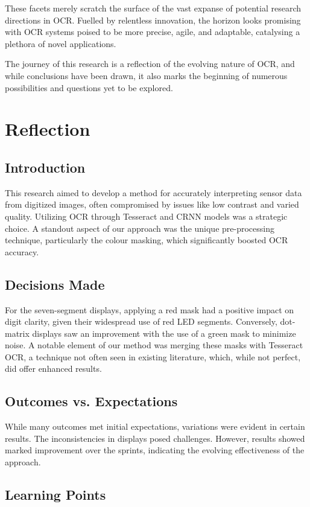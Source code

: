 These facets merely scratch the surface of the vast expanse of potential research directions in OCR. Fuelled by relentless innovation, the horizon looks promising with OCR systems poised to be more precise, agile, and adaptable, catalysing a plethora of novel applications.

The journey of this research is a reflection of the evolving nature of OCR, and while conclusions have been drawn, it also marks the beginning of numerous possibilities and questions yet to be explored.

\section{Reflection}

\subsection{Introduction}
This research aimed to develop a method for accurately interpreting sensor data from digitized images, often compromised by issues like low contrast and varied quality. Utilizing OCR through Tesseract and CRNN models was a strategic choice. A standout aspect of our approach was the unique pre-processing technique, particularly the colour masking, which significantly boosted OCR accuracy.

\subsection{Decisions Made}
For the seven-segment displays, applying a red mask had a positive impact on digit clarity, given their widespread use of red LED segments. Conversely, dot-matrix displays saw an improvement with the use of a green mask to minimize noise. A notable element of our method was merging these masks with Tesseract OCR, a technique not often seen in existing literature, which, while not perfect, did offer enhanced results.

\subsection{Outcomes vs. Expectations}
While many outcomes met initial expectations, variations were evident in certain results. The inconsistencies in displays posed challenges. However, results showed marked improvement over the sprints, indicating the evolving effectiveness of the approach.

\subsection{Learning Points}


